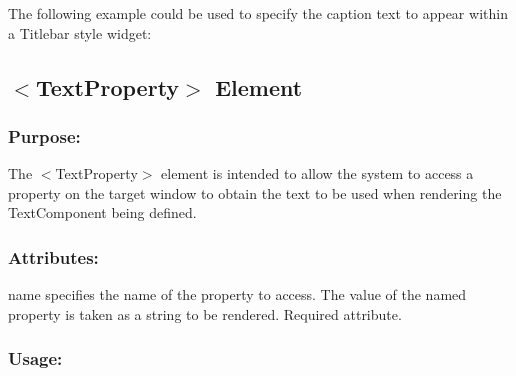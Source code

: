 The following example could be used to specify the caption text to appear within a Titlebar style widget\+: 
\begin{DoxyCode}{0}
\end{DoxyCode}
\hypertarget{fal_element_ref_fal_elem_ref_sec_33}{}\subsection{$<$\+Text\+Property$>$ Element}\label{fal_element_ref_fal_elem_ref_sec_33}
\hypertarget{fal_element_ref_fal_elem_ref_sec_33_1}{}\subsubsection{Purpose\+:}\label{fal_element_ref_fal_elem_ref_sec_33_1}
The {\ttfamily $<$Text\+Property$>$} element is intended to allow the system to access a property on the target window to obtain the text to be used when rendering the Text\+Component being defined.\hypertarget{fal_element_ref_fal_elem_ref_sec_33_2}{}\subsubsection{Attributes\+:}\label{fal_element_ref_fal_elem_ref_sec_33_2}
\begin{DoxyItemize}
\item {\ttfamily name} specifies the name of the property to access. The value of the named property is taken as a string to be rendered. Required attribute.\end{DoxyItemize}
\hypertarget{fal_element_ref_fal_elem_ref_sec_33_3}{}\subsubsection{Usage\+:}\label{fal_element_ref_fal_elem_ref_sec_33_3}

